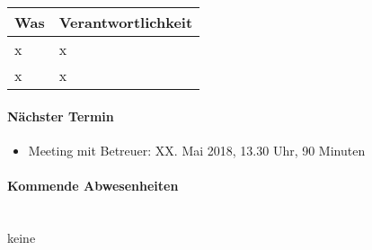 \begin{table}[H]
	\centering
	\begin{tabularx}{\textwidth}{X | p{4.5cm}}
		\rowcolor{gray!50}
		\textbf{Was} & \textbf{Verantwortlichkeit} \\
		\hline
		x & x \\
		x & x \\
	\end{tabularx}
	\label{tab:my-label}
\end{table}

\paragraph{Nächster Termin}
\begin{itemize}	
	\item Meeting mit Betreuer: XX. Mai 2018, 13.30 Uhr, 90 Minuten
\end{itemize}

\paragraph{Kommende Abwesenheiten} \mbox{}\\
keine